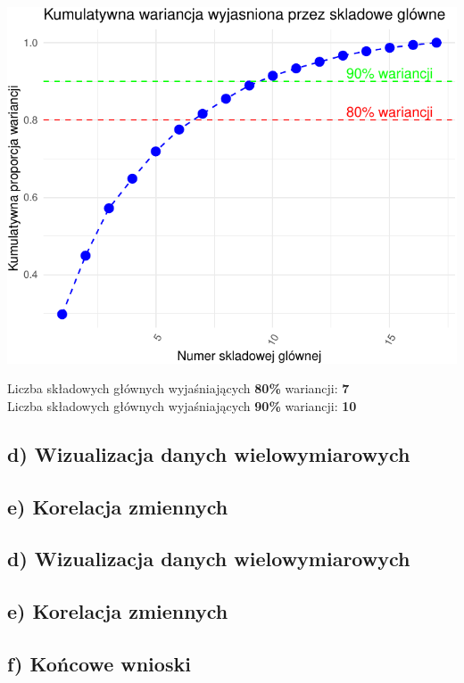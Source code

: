 \documentclass[
  12pt,
]{article}
\begin{document}
\begin{center}\includegraphics{Sprawozdanie2_files/figure-latex/Zmiennosc_skladowych_w_PCA-2} \end{center}

Liczba składowych głównych wyjaśniających \textbf{80\%} wariancji:
\textbf{7}\\
Liczba składowych głównych wyjaśniających \textbf{90\%} wariancji:
\textbf{10}

\subsection{d) Wizualizacja danych
wielowymiarowych}\label{d-wizualizacja-danych-wielowymiarowych}

\subsection{e) Korelacja zmiennych}\label{e-korelacja-zmiennych}

\subsection{d) Wizualizacja danych
wielowymiarowych}\label{d-wizualizacja-danych-wielowymiarowych-1}

\subsection{e) Korelacja zmiennych}\label{e-korelacja-zmiennych-1}

\subsection{f) Końcowe wnioski}\label{f-koux144cowe-wnioski}
\end{document}
